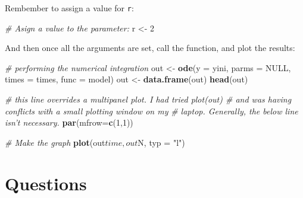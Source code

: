 \documentclass[]{book}
\newenvironment{Shaded}{\begin{snugshade}}{\end{snugshade}}
\newcommand{\KeywordTok}[1]{\textcolor[rgb]{0.13,0.29,0.53}{\textbf{{#1}}}}
\newcommand{\DataTypeTok}[1]{\textcolor[rgb]{0.13,0.29,0.53}{{#1}}}
\newcommand{\DecValTok}[1]{\textcolor[rgb]{0.00,0.00,0.81}{{#1}}}
\newcommand{\StringTok}[1]{\textcolor[rgb]{0.31,0.60,0.02}{{#1}}}
\newcommand{\CommentTok}[1]{\textcolor[rgb]{0.56,0.35,0.01}{\textit{{#1}}}}
\newcommand{\OtherTok}[1]{\textcolor[rgb]{0.56,0.35,0.01}{{#1}}}
\newcommand{\NormalTok}[1]{{#1}}
\begin{document}
Rembember to assign a value for \texttt{r}:

\begin{Shaded}
\begin{Highlighting}[]
\CommentTok{# Asign a value to the parameter:}
\NormalTok{r <-}\StringTok{ }\DecValTok{2}
\end{Highlighting}
\end{Shaded}

And then once all the arguments are set, call the function, and plot the
results:

\begin{Shaded}
\begin{Highlighting}[]
\CommentTok{# performing the numerical integration}
\NormalTok{out <-}\StringTok{ }\KeywordTok{ode}\NormalTok{(}\DataTypeTok{y =} \NormalTok{yini, }\DataTypeTok{parms =} \OtherTok{NULL}\NormalTok{, }\DataTypeTok{times =} \NormalTok{times, }\DataTypeTok{func =} \NormalTok{model)}
\NormalTok{out <-}\StringTok{ }\KeywordTok{data.frame}\NormalTok{(out)}
\KeywordTok{head}\NormalTok{(out)}

\CommentTok{# this line overrides a multipanel plot. I had tried plot(out) # and was having conflicts with a small plotting window on my}
\CommentTok{# laptop. Generally, the below line isn't necessary.}
\KeywordTok{par}\NormalTok{(}\DataTypeTok{mfrow=}\KeywordTok{c}\NormalTok{(}\DecValTok{1}\NormalTok{,}\DecValTok{1}\NormalTok{))}

\CommentTok{# Make the graph}
\KeywordTok{plot}\NormalTok{(out$time, out$N, }\DataTypeTok{typ =} \StringTok{"l"}\NormalTok{)}
\end{Highlighting}
\end{Shaded}

\section{Questions}\label{questions-10}
\end{document}
